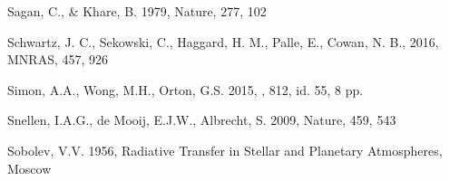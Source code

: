 \documentclass{emulateapj}
\begin{document}
\begin{thebibliography}{}
Sagan, C., \& Khare, B. 
   1979, Nature, 277, 102 

Schwartz, J. C., Sekowski, C., Haggard, H. M., Palle, E., Cowan, N. B., 
   2016, MNRAS, 457, 926

Simon, A.A., Wong, M.H., Orton, G.S.
   2015, \apj, 812, id. 55, 8 pp. 
      
Snellen, I.A.G., de Mooij, E.J.W., Albrecht, S.
   2009, Nature, 459, 543

Sobolev, V.V. 
   1956, Radiative Transfer in Stellar and Planetary Atmospheres, Moscow

\end{thebibliography}

\end{document}
